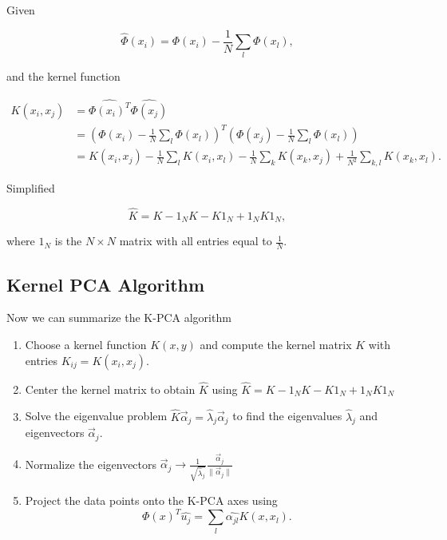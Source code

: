 Given

\[
	\hat{\Phi}(x_i) = \Phi(x_i) - \frac{1}{N} \sum_{l} \Phi(x_l),
\]

and the kernel function

\begin{align*}
	K(x_i, x_j) & = \hat{\Phi(x_i)^T} \hat{\Phi(x_j)}                                                                                        \\
	            & = \left( \Phi(x_i) - \frac{1}{N} \sum_{l} \Phi(x_l) \right)^T \left( \Phi(x_j) - \frac{1}{N} \sum_{l} \Phi(x_l) \right)    \\
	            & = K(x_i, x_j) - \frac{1}{N} \sum_{l} K(x_i, x_l) - \frac{1}{N} \sum_{k} K(x_k, x_j) + \frac{1}{N^2} \sum_{k,l} K(x_k, x_l).
\end{align*}

Simplified

\[
	\hat{K} = K - 1_N K - K 1_N + 1_N K 1_N,
\]

where \(1_N\) is the \(N \times N\) matrix with all entries equal to \(\frac{1}{N}\).

\subsection{Kernel PCA Algorithm}

Now we can summarize the K-PCA algorithm

\begin{enumerate}

	\item Choose a kernel function \(K(x, y)\) and compute the kernel matrix \(K\) with entries \(K_{ij} = K(x_i, x_j)\).

	\item Center the kernel matrix to obtain \(\hat{K}\) using \(\hat{K} = K - 1_N K - K 1_N + 1_N K 1_N\)

	\item Solve the eigenvalue problem \(\hat{K} \vec{\alpha}_j = \hat{\lambda}_j \vec{\alpha}_j\) to find the eigenvalues \(\hat{\lambda}_j\) 
	and eigenvectors \(\vec{\alpha}_j\).

	\item Normalize the eigenvectors \(\vec{\alpha}_j \to \frac{1}{\sqrt{\hat{\lambda}_j}} \frac{\vec{\alpha}_j}{\|\vec{\alpha}_j\|}\)

	\item Project the data points onto the K-PCA axes using
	      \[
		      \Phi(x)^T \hat{u_j} = \sum_{l} \hat{\alpha_{jl}} K(x, x_l).
	      \]

\end{enumerate}


